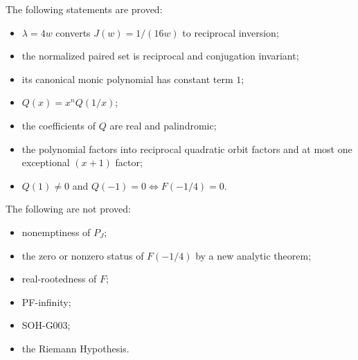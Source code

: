 The following statements are proved:
\begin{itemize}
 \item $\lambda=4w$ converts $J(w)=1/(16w)$ to reciprocal inversion;
 \item the normalized paired set is reciprocal and conjugation invariant;
 \item its canonical monic polynomial has constant term $1$;
 \item $Q(x)=x^nQ(1/x)$;
 \item the coefficients of $Q$ are real and palindromic;
 \item the polynomial factors into reciprocal quadratic orbit factors and at most one exceptional $(x+1)$ factor;
 \item $Q(1)\neq0$ and $Q(-1)=0\iff F(-1/4)=0$.
\end{itemize}

The following are not proved:
\begin{itemize}
 \item nonemptiness of $P_J$;
 \item the zero or nonzero status of $F(-1/4)$ by a new analytic theorem;
 \item real-rootedness of $F$;
 \item PF-infinity;
 \item SOH-G003;
 \item the Riemann Hypothesis.
\end{itemize}
